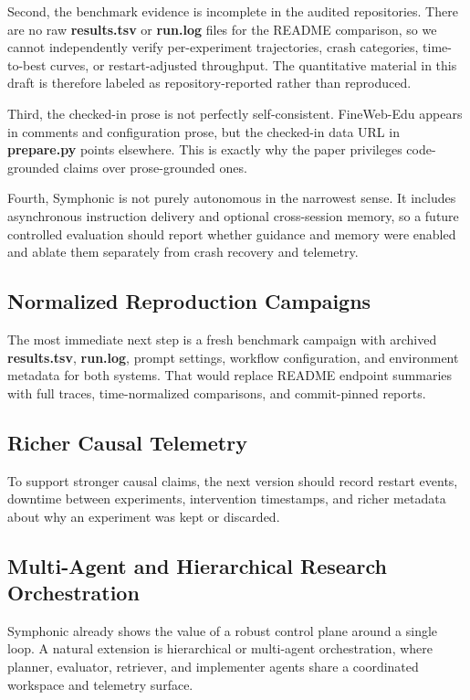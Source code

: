 \documentclass[conference]{IEEEtran}
\newcommand{\file}[1]{{\ttfamily\bfseries\textcolor{accentteal}{#1}}}
\begin{document}
Second, the benchmark evidence is incomplete in the audited repositories. There are no raw \file{results.tsv} or \file{run.log} files for the README comparison, so we cannot independently verify per-experiment trajectories, crash categories, time-to-best curves, or restart-adjusted throughput. The quantitative material in this draft is therefore labeled as repository-reported rather than reproduced.

Third, the checked-in prose is not perfectly self-consistent. FineWeb-Edu appears in comments and configuration prose, but the checked-in data URL in \file{prepare.py} points elsewhere. This is exactly why the paper privileges code-grounded claims over prose-grounded ones.

Fourth, Symphonic is not purely autonomous in the narrowest sense. It includes asynchronous instruction delivery and optional cross-session memory, so a future controlled evaluation should report whether guidance and memory were enabled and ablate them separately from crash recovery and telemetry.

\subsection{Normalized Reproduction Campaigns}
The most immediate next step is a fresh benchmark campaign with archived \file{results.tsv}, \file{run.log}, prompt settings, workflow configuration, and environment metadata for both systems. That would replace README endpoint summaries with full traces, time-normalized comparisons, and commit-pinned reports.

\subsection{Richer Causal Telemetry}
To support stronger causal claims, the next version should record restart events, downtime between experiments, intervention timestamps, and richer metadata about why an experiment was kept or discarded.

\subsection{Multi-Agent and Hierarchical Research Orchestration}
Symphonic already shows the value of a robust control plane around a single loop. A natural extension is hierarchical or multi-agent orchestration, where planner, evaluator, retriever, and implementer agents share a coordinated workspace and telemetry surface.
\end{document}
